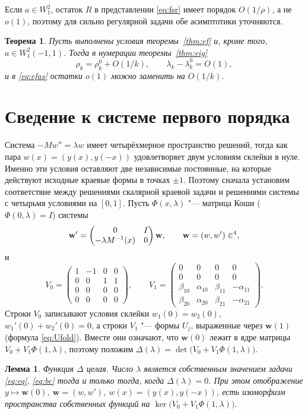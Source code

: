 \documentclass[12pt,a4paper]{article}
\numberwithin{equation}{section}
\newtheorem{theorem}{Теорема}
\newtheorem{lemma}{Лемма}
\theoremstyle{definition}
\let\C\relax\newcommand{\C}{\mathbb C}
\begin{document}
Если $a\in W^2_1$, остаток $R$ в представлении \eqref{eq:fsr} имеет порядок $O(1/\rho)$, а не
$o(1)$, поэтому для сильно регулярной задачи обе асимптотики уточняются.

\begin{theorem}\label{thm:o1k}
Пусть выполнены условия теоремы~\ref{thm:ef} и, кроме того, $a\in W^2_1(-1,1)$. Тогда в
нумерации теоремы~\ref{thm:eig}
\[
 \rho_k=\rho_k^0+O(1/k),\qquad\lambda_k-\lambda_k^0=O(1),
\]
и в \eqref{eq:efas} остатки $o(1)$ можно заменить на $O(1/k)$.
\end{theorem}

\section{Сведение к системе первого порядка}

Система $-Mw''=\lambda w$ имеет четырёхмерное пространство решений, тогда как пара
$w(x)=(y(x),y(-x))$ удовлетворяет двум условиям склейки в нуле. Именно эти условия
оставляют две независимые постоянные, на которые действуют исходные краевые формы
в точках $\pm1$. Поэтому сначала установим соответствие между решениями скалярной
краевой задачи и решениями системы с четырьмя условиями на $[0,1]$.
Пусть
$\Phi(x,\lambda)$ "--- матрица Коши ($\Phi(0,\lambda)=I$) системы
\[
 \mathbf w'=\begin{pmatrix}0&I\\-\lambda M^{-1}(x)&0\end{pmatrix}\mathbf w,\qquad
 \mathbf w=(w,w')\in\C^4,
\]
и
\[
 V_0=\begin{pmatrix}1&-1&0&0\\0&0&1&1\\0&0&0&0\\0&0&0&0\end{pmatrix},\qquad
 V_1=\begin{pmatrix}0&0&0&0\\0&0&0&0\\ \beta_{10}&\alpha_{10}&\beta_{11}&-\alpha_{11}\\
 \beta_{20}&\alpha_{20}&\beta_{21}&-\alpha_{21}\end{pmatrix}.
\]
Строки $V_0$ записывают условия склейки $w_1(0)=w_2(0)$, $w_1'(0)+w_2'(0)=0$, а строки $V_1$ "---
формы $U_j$, выраженные через $\mathbf w(1)$ (формула \eqref{eq:Ufold}). Вместе они означают, что
$\mathbf w(0)$ лежит в ядре матрицы $V_0+V_1\Phi(1,\lambda)$, поэтому положим
$\Delta(\lambda)=\det\bigl(V_0+V_1\Phi(1,\lambda)\bigr)$.

\begin{lemma}\label{lem:fold}
Функция $\Delta$ целая. Число $\lambda$ является собственным значением задачи \eqref{eq:eq},
\eqref{eq:bc} тогда и только тогда, когда $\Delta(\lambda)=0$. При этом отображение
$y\mapsto\mathbf w(0)$, $\mathbf w=(w,w')$, $w(x)=(y(x),y(-x))$, есть изоморфизм пространства
собственных функций на $\ker\bigl(V_0+V_1\Phi(1,\lambda)\bigr)$.
\end{lemma}
\end{document}
